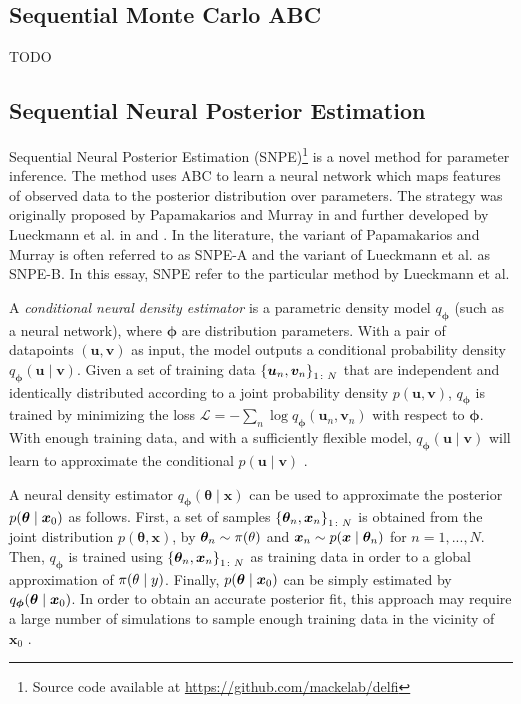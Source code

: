 \subsection{Sequential Monte Carlo ABC}\label{sec:smc_abc}

TODO

\subsection{Sequential Neural Posterior Estimation}
Sequential Neural Posterior Estimation (SNPE)\footnote{Source code available at \url{https://github.com/mackelab/delfi}} is a novel method for parameter inference. The method uses ABC to learn a neural network which maps features of observed data to the posterior distribution over parameters. The strategy was originally proposed by Papamakarios and Murray in \cite{papamakarios2016fast} and further developed by Lueckmann et al. in \cite{SNPE17} and \cite{SNPE19}. In the literature, the variant of Papamakarios and Murray is often referred to as SNPE-A and the variant of Lueckmann et al. as SNPE-B. In this essay, SNPE refer to the particular method by Lueckmann et al.

A \textit{conditional neural density estimator} is a parametric density model $q_{\bm{\phi}}$ (such as a neural network), where $\bm{\phi}$ are distribution parameters. With a pair of datapoints $(\bm{u}, \bm{v})$ as input, the model outputs a conditional probability density $q_{\bm{\phi}}(\bm{u}\mid \bm{v})$. Given a set of training data $\qty{\bm{u}_n, \bm{v}_n}_{1\colon N}$ that are independent and identically distributed according to a joint probability density $p(\bm{u}, \bm{v})$, $q_{\bm{\phi}}$ is trained by minimizing the loss $\mathcal{L} = - \sum_n \log q_{\bm{\phi}}(\bm{u}_n, \bm{v}_n)$ with respect to $\bm{\phi}$. With enough training data, and with a sufficiently flexible model, $q_{\bm{\phi}}(\bm{u}\mid \bm{v})$ will learn to approximate the conditional $p(\bm{u}\mid \bm{v})$ \cite{SNL18}. 

A neural density estimator $q_{\bm{\phi}}(\bm{\theta} \mid \bm{x})$ can be used to approximate the posterior $p \qty(\bm{\theta}\mid \bm{x}_0)$ as follows. First, a set of samples $\qty{\bm{\theta}_n , \bm{x}_n}_{1\colon N}$ is obtained from the joint distribution $p (\bm{\theta}, \bm{x})$, by $\bm{\theta}_n \sim \pi \qty(\theta)$ and $\bm{x}_n \sim p \qty(\bm{x} \mid \bm{\theta}_n)$ for $n=1, ..., N$. Then, $q_{\bm{\phi}}$ is trained using $\qty{\bm{\theta}_n , \bm{x}_n}_{1\colon N}$ as training data in order to a global approximation of $\pi \qty(\theta \mid y)$. Finally, $p \qty(\bm{\theta} \mid \bm{x}_0)$ can be simply estimated by $q_{\bm{\phi}} \qty(\bm{\theta} \mid \bm{x}_0)$. In order to obtain an accurate posterior fit, this approach may require a large number of simulations to sample enough training data in the vicinity of $\bm{x}_0$ \cite{SNL18}. 

